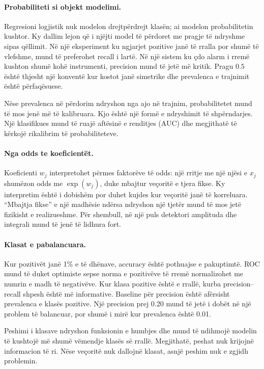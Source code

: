 \documentclass[12pt,a4paper,oneside]{book}
\begin{document}
\paragraph{Probabiliteti si objekt modelimi.}
Regresioni logjistik nuk modelon drejtpërdrejt klasën; ai modelon probabilitetin kushtor. Ky dallim lejon që i njëjti model të përdoret me pragje të ndryshme sipas qëllimit. Në një eksperiment ku ngjarjet pozitive janë të rralla por shumë të vlefshme, mund të preferohet recall i lartë. Në një sistem ku çdo alarm i rremë kushton shumë kohë instrumenti, precision mund të jetë më kritik. Pragu $0.5$ është thjesht një konventë kur kostot janë simetrike dhe prevalenca e trajnimit është përfaqësuese.

Nëse prevalenca në përdorim ndryshon nga ajo në trajnim, probabilitetet mund të mos jenë më të kalibruara. Kjo është një formë e ndryshimit të shpërndarjes. Një klasifikues mund të ruajë aftësinë e renditjes (AUC) dhe megjithatë të kërkojë rikalibrim të probabiliteteve.

\paragraph{Nga odds te koeficientët.}
Koeficienti $w_j$ interpretohet përmes faktorëve të odds: një rritje me një njësi e $x_j$ shumëzon odds me $\exp(w_j)$, duke mbajtur veçoritë e tjera fikse. Ky interpretim është i dobishëm por duhet kujdes kur veçoritë janë të korreluara. ``Mbajtja fikse'' e një madhësie ndërsa ndryshon një tjetër mund të mos jetë fizikisht e realizueshme. Për shembull, në një puls detektori amplituda dhe integrali mund të jenë të lidhura fort.

\paragraph{Klasat e pabalancuara.}
Kur pozitivët janë 1\% e të dhënave, accuracy është pothuajse e pakuptimtë. ROC mund të duket optimiste sepse norma e pozitivëve të rremë normalizohet me numrin e madh të negativëve. Kur klasa pozitive është e rrallë, kurba precision--recall shpesh është më informative. Baseline për precision është afërsisht prevalenca e klasës pozitive. Një precision prej 0.20 mund të jetë i dobët në një problem të balancuar, por shumë i mirë kur prevalenca është 0.01.

Peshimi i klasave ndryshon funksionin e humbjes dhe mund të ndihmojë modelin të kushtojë më shumë vëmendje klasës së rrallë. Megjithatë, peshat nuk krijojnë informacion të ri. Nëse veçoritë nuk dallojnë klasat, asnjë peshim nuk e zgjidh problemin.
\end{document}
